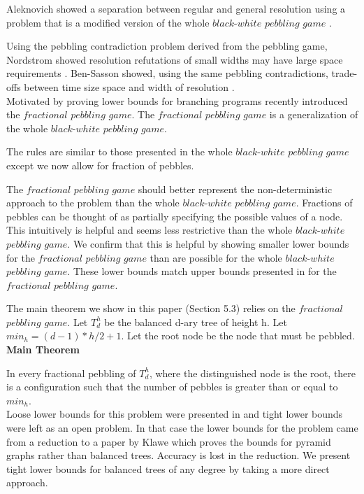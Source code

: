 \documentclass[12pt]{article}
\begin{document}
Aleknovich showed a separation between regular and general resolution using a problem that is a modified version of the whole $black$-$white$ $pebbling$ $game$ \cite{alek:sepres}.

Using the pebbling contradiction problem derived from the pebbling game, Nordstrom showed resolution refutations of small widths may have large space requirements \cite{n:narrowpf}. Ben-Sasson showed, using the same pebbling contradictions, trade-offs between time size space and width of resolution \cite{bs:wsstrade}.\\



Motivated by proving lower bounds for branching programs \cite{c:pebjournal} recently introduced the $fractional $ $pebbling$ $game$. The $fractional $ $pebbling$ $game$ is a generalization of the whole $black$-$white$ $pebbling$ $game$. 

The rules are similar to those presented in the whole $black$-$white$ $pebbling$ $game$ except we now allow for fraction of pebbles. 

The $fractional $ $pebbling$ $game$ should better represent the non-deterministic approach to the problem than the whole $black$-$white$ $pebbling$ $game$. Fractions of pebbles can be thought of as partially specifying the possible values of a node. This intuitively is helpful and seems less restrictive than the whole $black$-$white$ $pebbling$ $game$. We confirm that this is helpful by showing smaller lower bounds for the $fractional $ $pebbling$ $game$ than are possible for the whole $black$-$white$ $pebbling$ $game$. These lower bounds match upper bounds presented in \cite{c:pebjournal} for the $fractional $ $pebbling$ $game$.

The main theorem we show in this paper (Section 5.3) relies on the $fractional $ $pebbling$ $game$. Let  $T^h_d$ be the balanced d-ary tree of height h. Let $min_h = (d-1) * h/2+1$. Let the root node be the node that must be pebbled. \\

\noindent
{\bf Main Theorem}

\noindent
In every fractional pebbling of $T^h_d$, where the distinguished node is the root, there is a configuration such
that the number of pebbles is greater than or equal to $min_h$.\\

Loose lower bounds for this problem were presented in \cite{c:pebjournal} and tight lower bounds were left as an open problem. In that case the lower bounds for the problem came from a reduction to a paper by Klawe \cite{k:bwpyr} which proves the bounds for pyramid graphs rather than balanced trees. Accuracy is lost in the reduction. We present tight lower bounds for balanced trees of any degree by taking a more direct approach.
\end{document}
